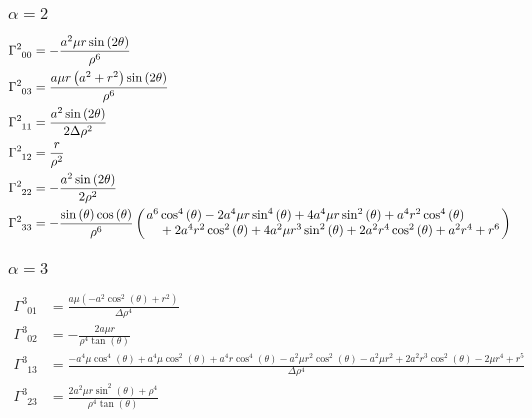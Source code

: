 \documentclass[11pt,a4paper]{article}
\begin{document}
\subsubsection*{$\alpha = 2$}
\begin{align}
	\Gamma^2_{\phantom{2} 0 0} &=- \frac{a^{2} \mu r \sin{\left(2 \theta \right)}}{\rho^{6}}\\
	\Gamma^2_{\phantom{2} 0 3} &=\frac{a \mu r \left(a^{2} + r^{2}\right) \sin{\left(2 \theta \right)}}{\rho^{6}}\\
	\Gamma^2_{\phantom{2} 1 1} &=\frac{a^{2} \sin{\left(2 \theta \right)}}{2 \Delta \rho^{2}}\\
	\Gamma^2_{\phantom{2} 1 2} &=\frac{r}{\rho^{2}}\\
	\Gamma^2_{\phantom{2} 2 2} &=- \frac{a^{2} \sin{\left(2 \theta \right)}}{2 \rho^{2}}\\
	\Gamma^2_{\phantom{2} 3 3} &=- \frac{\sin{\left(\theta \right)} \cos{(\theta)}}{\rho^{6}}\left(\splitfrac{a^{6} \cos^{4}{\left(\theta \right)} - 2 a^{4} \mu r \sin^{4}{\left(\theta \right)} + 4 a^{4} \mu r \sin^{2}{\left(\theta \right)} + a^{4} r^{2} \cos^{4}{\left(\theta \right)} }{+ 2 a^{4} r^{2} \cos^{2}{\left(\theta \right)} + 4 a^{2} \mu r^{3} \sin^{2}{\left(\theta \right)} + 2 a^{2} r^{4} \cos^{2}{\left(\theta \right)} + a^{2} r^{4} + r^{6} } \right)\\
\end{align}
	
\subsubsection*{$\alpha = 3$}
\begin{align}
	\Gamma^3_{\phantom{3} 0 1} &=\frac{a \mu \left(- a^{2} \cos^{2}{\left(\theta \right)} + r^{2}\right)}{\Delta \rho^{4}}\\
	\Gamma^3_{\phantom{3} 0 2} &=- \frac{2 a \mu r}{\rho^{4} \tan{\left(\theta \right)}}\\
	\Gamma^3_{\phantom{3} 1 3} &=\frac{- a^{4} \mu \cos^{4}{\left(\theta \right)} + a^{4} \mu \cos^{2}{\left(\theta \right)} + a^{4} r \cos^{4}{\left(\theta \right)} - a^{2} \mu r^{2} \cos^{2}{\left(\theta \right)} - a^{2} \mu r^{2} + 2 a^{2} r^{3} \cos^{2}{\left(\theta \right)} - 2 \mu r^{4} + r^{5}}{\Delta \rho^{4}}\\
	\Gamma^3_{\phantom{3} 2 3} &=\frac{2 a^{2} \mu r \sin^{2}{\left(\theta \right)} + \rho^{4}}{\rho^{4} \tan{\left(\theta \right)}}\\
\end{align}
\end{document}

